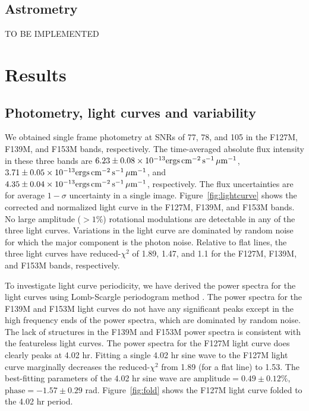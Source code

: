 \documentclass[twocolumn]{aastex62}
\begin{document}
\subsection{Astrometry}
TO BE IMPLEMENTED

\section{Results}
\subsection{Photometry, light curves and variability}

\newcommand{\fluxunit}{\ensuremath{\mathrm{ergs}\,\mathrm{cm^{-2}}\,\mathrm{s^{-1}}\,\mathrm{\micron^{{-1}}}}}
We obtained single frame photometry at SNRs of 77, 78, and 105 in the F127M, F139M, and F153M bands, respectively. The time-averaged absolute flux intensity in these three bands are $6.23\pm0.08\times10^{-13}\fluxunit$, $3.71\pm0.05\times10^{-13}\fluxunit$, and $4.35\pm0.04\times10^{{-13}}\fluxunit$, respectively. The flux uncertainties are for average $1-\sigma$ uncertainty in a single image. Figure~\ref{fig:lightcurve} shows the corrected and normalized light curve in the F127M, F139M, and F153M bands.  No large amplitude ($>1\%$) rotational modulations are detectable in any of the three light curves. Variations in the light curve are dominated by random noise for which the major component is the photon noise. Relative to flat lines, the three light curves have reduced-$\chi^{2}$ of 1.89, 1.47, and 1.1 for the F127M, F139M, and F153M bands, respectively.

To investigate light curve periodicity, we have derived the power spectra for the light curves using Lomb-Scargle periodogram method \citep[][Figure~\ref{fig:periodogram}]{Lomb1976}. The power spectra for the F139M and F153M light curves do not have any significant peaks except in the high frequency ends of the power spectra, which are dominated by random noise. The lack of structures in the F139M and F153M power spectra is consistent with the featureless light curves. The power spectra for the F127M light curve does clearly peaks at 4.02 hr. Fitting a single 4.02 hr sine wave to the F127M light curve marginally decreases the reduced-$\chi^{2}$ from 1.89 (for a flat line) to 1.53. The best-fitting parameters of the 4.02 hr sine wave are $\mathrm{amplitude}=0.49\pm0.12\%$, $\mathrm{phase} = -1.57\pm0.29$ rad. Figure~\ref{fig:fold} shows the F127M light curve folded to the 4.02 hr period.
\end{document}
